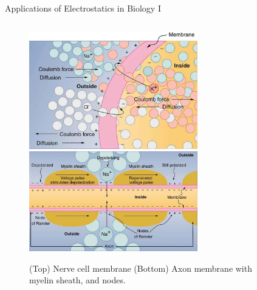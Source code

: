 \documentclass{beamer}
\begin{document}
\begin{frame}{Applications of Electrostatics in Biology I}
\small
\begin{columns}[T]
\begin{column}{0.5\textwidth}
\begin{figure}
\centering
\includegraphics[width=0.75\textwidth]{figures/cell_wall.png} \\
\includegraphics[width=0.75\textwidth]{figures/cell_wall_2.png}
\caption{\label{fig:nerve_a} (Top) Nerve cell membrane (Bottom) Axon membrane with myelin sheath, and nodes.}
\end{figure}
\end{column}
\begin{column}{0.5\textwidth}
\begin{figure}
\centering

\end{figure}
\end{column}
\end{columns}
\end{frame}
\end{document}
